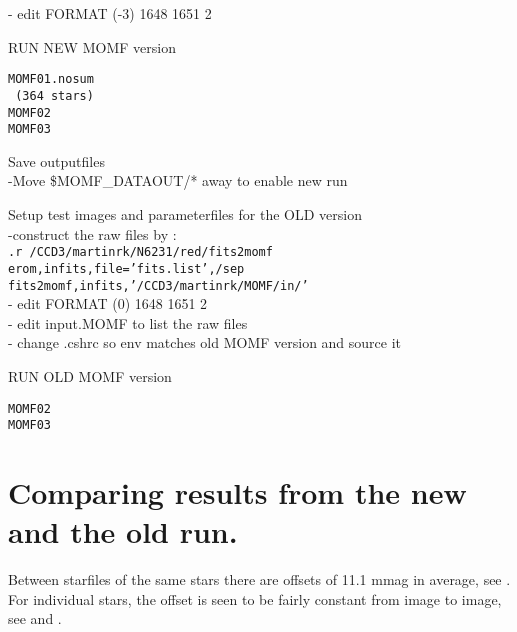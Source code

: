 \documentclass[11pt,a4paper,twoside]{article}
\begin{document}
- edit FORMAT (-3) 1648 1651 2
\item{RUN NEW MOMF version}\\
\begin{verbatim}
MOMF01.nosum
 (364 stars)
MOMF02
MOMF03
\end{verbatim}
\item{Save outputfiles}\\
-Move {\$}MOMF{\_}DATAOUT/* away to enable new run
\item{Setup test images and parameterfiles for the OLD version}\\
-construct the raw files by :\\
\texttt{.r /CCD3/martinrk/N6231/red/fits2momf}\\
\texttt{erom,infits,file='fits.list',/sep}\\
\texttt{fits2momf,infits,'/CCD3/martinrk/MOMF/in/'}\\
- edit FORMAT (0) 1648 1651 2\\
- edit input.MOMF to list the raw files\\
- change .cshrc so env matches old MOMF version and source it\\
\item{RUN OLD MOMF version}\\
\begin{verbatim}
MOMF02
MOMF03
\end{verbatim}
\ei
\newpage
\section{Comparing results from the new and the old run.}
Between starfiles of the same stars there are offsets of 11.1 mmag
in average, see .
For individual stars, the offset is seen to be fairly constant from
image to image, see  and .

\begin{figure}[!th]
\begin{center}
\end{center}
\end{figure}
\begin{figure}[!th]
\begin{center}
\end{center}
\end{figure}
\end{document}
